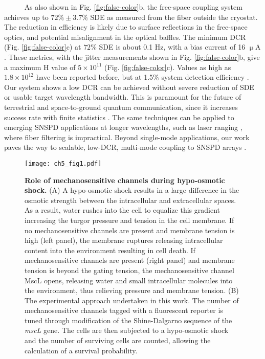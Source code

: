 \documentclass[12pt]{caltech_thesis}
\begin{document}
~~~~~ As also shown in Fig. \ref{fig:false-color}b, the free-space
coupling system achieves up to \(72 \% \pm 3.7 \%\) SDE as measured from
the fiber outside the cryostat. The reduction in efficiency is likely
due to surface reflections in the free-space optics, and potential
misalignment in the optical baffles. The minimum DCR (Fig.
\ref{fig:false-color}c) at \(72 \%\) SDE is about 0.1 Hz, with a bias
current of 16 \(\mathrm{\upmu A}\). These metrics, with the jitter
measurements shown in Fig. \ref{fig:false-color}b, give a maximum H
value of \(5 \times 10^{11}\) (Fig. \ref{fig:false-color}c). Values as
high as \(1.8 \times 10^{12}\) have been reported before, but at 1.5\%
system detection efficiency \cite{Shibata2015}. Our system shows a low
DCR can be achieved without severe reduction of SDE or usable target
wavelength bandwidth. This is paramount for the future of terrestrial
and space-to-ground quantum communication, since it increases success
rate with finite statistics \cite{Boaron2018secure}. The same techniques
can be applied to emerging SNSPD applications at longer wavelengths,
such as laser ranging \cite{Taylor2019}, where fiber filtering is
impractical. Beyond single-mode applications, our work paves the way to
scalable, low-DCR, multi-mode coupling to SNSPD arrays
\cite{Wollman2019}.

\hypertarget{fig:overview_2}{%
\begin{figure}
\centering
\texttt{[image: ch5\_fig1.pdf]}
\caption[{Role of mechanosensitive channels during hypo-osmotic
shock.}]{\textbf{Role of mechanosensitive channels during hypo-osmotic
shock.} (A) A hypo-osmotic shock results in a large difference in the
osmotic strength between the intracellular and extracellular spaces. As
a result, water rushes into the cell to equalize this gradient
increasing the turgor pressure and tension in the cell membrane. If no
mechanosensitive channels are present and membrane tension is high (left
panel), the membrane ruptures releasing intracellular content into the
environment resulting in cell death. If mechanosensitive channels are
present (right panel) and membrane tension is beyond the gating tension,
the mechanosensitive channel MscL opens, releasing water and small
intracellular molecules into the environment, thus relieving pressure
and membrane tension. (B) The experimental approach undertaken in this
work. The number of mechanosensitive channels tagged with a fluorescent
reporter is tuned through modification of the Shine-Dalgarno sequence of
the \emph{mscL} gene. The cells are then subjected to a hypo-osmotic
shock and the number of surviving cells are counted, allowing the
calculation of a survival probability.}
\label{fig:overview_2}
\end{figure}
}
\end{document}

